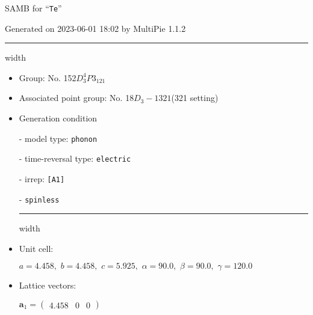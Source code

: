 \documentclass[fleqn,10pt,landscape]{article}
\begin{document}
\setcounter{MaxMatrixCols}{16}

\setlength{\baselineskip}{16pt}
\footnotesize
\begin{center}
\LARGE
SAMB for ``\texttt{Te}''
\end{center}
\begin{flushright}
Generated on 2023-06-01 18:02 by MultiPie 1.1.2
\end{flushright}
\vspace{1cm}


 \hfil \hrule height 1mm width \textwidth \hfil

\begin{itemize}
\item Group: No. 152\quad$D_{3}^{4}$\quad$P3_121$\quad[ trigonal ]

\item Associated point group: No. 18\quad$D_{3}-1$\quad$321$\quad(321 setting)\quad[ trigonal ]

\vspace{5mm}

\item Generation condition

\quad - model type: \texttt{phonon}

\quad - time-reversal type: \texttt{electric}

\quad - irrep: \texttt{[A1]}

\quad - \texttt{spinless}


 \hfil \hrule height 1mm width \textwidth \hfil

\item Unit cell:

\quad $a=4.458,\,\, b=4.458,\,\, c=5.925,\,\, \alpha=90.0,\,\, \beta=90.0,\,\, \gamma=120.0$

\item Lattice vectors:

\quad $\bm{a}_1=\begin{pmatrix} 4.458 & 0 & 0 \end{pmatrix}$


\end{itemize}
\end{document}
